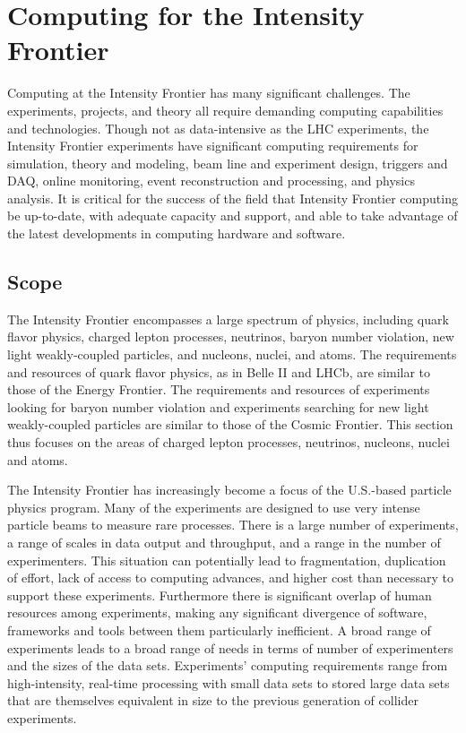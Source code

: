 \section{Computing for the Intensity Frontier}

Computing at the Intensity Frontier has many significant challenges. The
experiments, projects, and theory all require demanding computing capabilities
and technologies.  Though not as data-intensive as the LHC experiments, the Intensity Frontier
experiments have significant computing requirements for simulation,  theory
and modeling, beam line and experiment design, triggers and DAQ, online
monitoring, event reconstruction and processing, and physics analysis.  It is
critical for the success of the field that Intensity Frontier computing be up-to-date, with adequate 
capacity and support, and able to take advantage of the latest
developments in computing hardware and software.

\subsection{Scope}
The Intensity Frontier encompasses a large spectrum of physics, including quark flavor
physics,  charged lepton processes, neutrinos, baryon number violation,  new
light weakly-coupled particles, and nucleons, nuclei, and atoms.  The
requirements and resources of quark flavor physics, as in Belle II and LHCb,
are similar to those of the Energy Frontier. The requirements and
resources of  experiments looking for baryon number violation and  experiments
searching for new light weakly-coupled particles are similar to  those of the
Cosmic Frontier.  This section thus focuses on the areas of charged lepton processes,  neutrinos, nucleons,
nuclei and atoms.

The Intensity Frontier has increasingly become a focus of the U.S.-based particle physics program. Many  of
the experiments are designed to use very intense particle beams to measure
rare processes. There is a large number of experiments, a range of scales
in data output and throughput, and a range in the number of experimenters.
This situation can potentially lead to fragmentation, duplication of effort, lack of
access to computing advances, and higher cost than necessary to support these experiments. 
Furthermore there is significant overlap of human resources among experiments, making any significant
divergence of  software, frameworks and tools between them particularly
inefficient.  A broad range of experiments leads to a broad range of needs in 
terms of number of experimenters and the sizes of the data sets. Experiments'
computing requirements range from high-intensity, real-time processing with 
small data sets to stored large data sets that are themselves equivalent in 
size to the previous generation of collider experiments. 


